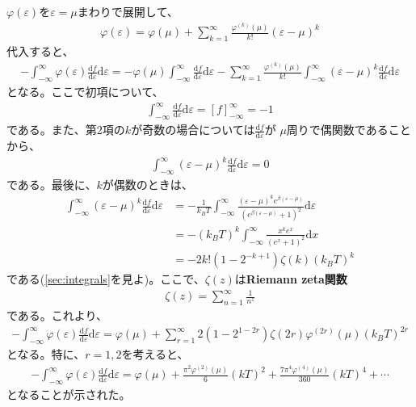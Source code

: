 \documentclass{jsarticle}
\def\d{\textrm{d}}
\begin{document}
$\varphi(\varepsilon)$を$\varepsilon=\mu$まわりで展開して、
\begin{align*}
\varphi(\varepsilon)=\varphi(\mu)+\sum_{k=1}^{\infty}\frac{\varphi^{(k)}(\mu)}{k!}(\varepsilon-\mu)^{k}
\end{align*}
代入すると、
\begin{align*}
-\int_{-\infty}^{\infty}\varphi(\varepsilon)\frac{\d f}{\d\varepsilon}\d\varepsilon
=-\varphi(\mu)\int_{-\infty}^{\infty}\frac{\d f}{\d\varepsilon}\d\varepsilon
-\sum_{k=1}^{\infty}\frac{\varphi^{(k)}(\mu)}{k!}\int_{-\infty}^{\infty}
(\varepsilon-\mu)^{k}\frac{\d f}{\d\varepsilon}\d\varepsilon
\end{align*}
となる。ここで初項について、
\begin{align*}
\int_{-\infty}^{\infty}\frac{\d f}{\d\varepsilon}\d\varepsilon
=\left[f\right]_{-\infty}^{\infty}=-1
\end{align*}
である。また、第2項の$k$が奇数の場合については$\frac{\d f}{\d\varepsilon}$が
$\mu$周りで偶関数であることから、
\begin{align*}
\int_{-\infty}^{\infty}(\varepsilon-\mu)^{k}\frac{\d f}{\d\varepsilon}\d\varepsilon=0
\end{align*}
である。最後に、$k$が偶数のときは、
\begin{align*}
\int_{-\infty}^{\infty}(\varepsilon-\mu)^{k}\frac{\d f}{\d\varepsilon}\d\varepsilon
&=-\frac{1}{k_{B}T}\int_{-\infty}^{\infty}\frac{(\varepsilon-\mu)^{k}e^{\beta(\varepsilon-\mu)}}{(e^{\beta(\varepsilon-\mu)}+1)^{2}}\d\varepsilon\\
&=-(k_{B}T)^{k}\int_{-\infty}^{\infty}\frac{x^{k}e^{x}}{(e^{x}+1)^{2}}\d x\\
&=-2k!(1-2^{-k+1})\zeta(k)(k_{B}T)^{k}
\end{align*}
である(\ref{sec:integrals}を見よ)。ここで、$\zeta(z)$は\textbf{Riemann zeta関数}
\begin{align*}
\zeta(z)=\sum_{n=1}^{\infty}\frac{1}{n^{z}}
\end{align*}
である。これより、
\begin{align*}
-\int_{-\infty}^{\infty}\varphi(\varepsilon)\frac{\d f}{\d\varepsilon}\d\varepsilon
=\varphi(\mu)+\sum_{r=1}^{\infty}2(1-2^{1-2r})\zeta(2r)\varphi^{(2r)}(\mu)(k_{B}T)^{2r}
\end{align*}
となる。特に、$r=1,2$を考えると、
\begin{align*}
-\int_{-\infty}^{\infty}\varphi(\varepsilon)\frac{\d f}{\d\varepsilon}\d\varepsilon
=\varphi(\mu)+\frac{\pi^{2}\varphi^{(2)}(\mu)}{6}(kT)^{2}
+\frac{7\pi^{4}\varphi^{(4)}(\mu)}{360}(kT)^{4}+\cdots
\end{align*}
となることが示された。
\end{document}

